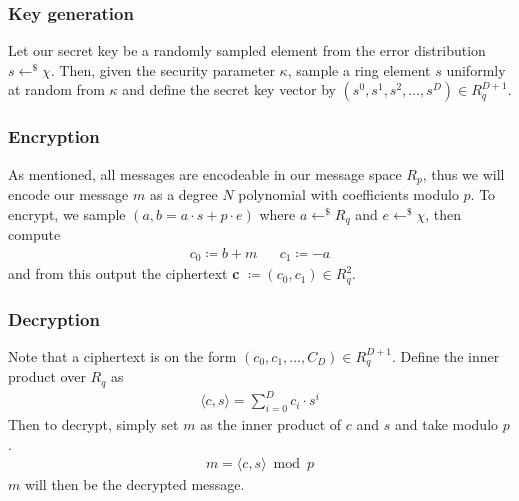 \documentclass[../main.tex]{subfiles}
\begin{document}
\subsubsection{Key generation}
Let our secret key be a randomly sampled element from the error distribution $s \leftarrow^\$ \chi$.
Then, given the security parameter $\kappa$, sample a ring element $s$ uniformly at random from $\kappa$ and define the
secret key vector by $(s^0, s^1, s^2, \dots, s^D) \in R_q^{D+1}$.

\subsubsection{Encryption}
As mentioned, all messages are encodeable in our message space $R_p$, thus we will encode our message $m$ as a degree $N$
polynomial with coefficients modulo $p$.
To encrypt, we sample $(a, b = a \cdot s + p \cdot e)$ where $a \leftarrow^\$ R_q$ and $e \leftarrow^\$ \chi$,
then compute
\begin{align*}
    c_0 \coloneqq b + m &  & c_1 \coloneqq -a
\end{align*}
and from this output the ciphertext \textbf{c} $\coloneqq (c_0, c_1) \in R_q^2$.

\subsubsection{Decryption}
Note that a ciphertext is on the form $(c_0, c_1, \dots , C_{D}) \in R_q^{D+1}$.
Define the inner product over $R_q$ as
\begin{align*}
    \langle c, s \rangle = \sum_{i=0}^{D} c_i \cdot s^i
\end{align*}
Then to decrypt, simply set $m$ as the inner product of $c$ and $s$ and take modulo $p$.
\begin{align*}
    m = \langle c, s \rangle \bmod p
\end{align*}
$m$ will then be the decrypted message.
\end{document}

